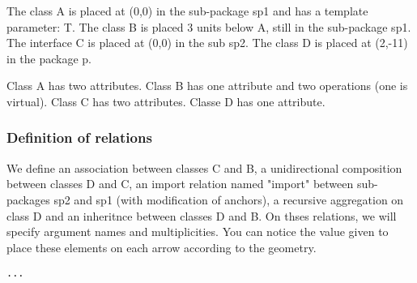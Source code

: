 \documentclass[a4paper,11pt]{report}
\begin{document}
The class A is placed at (0,0) in the sub-package sp1 and has a template parameter: T. The class B is placed 3 units below A, still in the sub-package sp1. The interface C is placed at (0,0) in the sub sp2. 
The class D is placed at (2,-11) in the package p.

Class A has two attributes. Class B has one attribute and two operations (one is virtual). Class C has two attributes. Classe D has one attribute.

\vspace{-0.4cm}
{\color{red!70!black}
\vspace{-0.4cm}
}
\vspace{-0.4cm}
{\color{red!70!black}
\vspace{-0.4cm}
}
\vspace{-0.4cm}
{\color{red!70!black}
\vspace{-0.4cm}
}


\begin{center}
\end{center}


\subsubsection{Definition of relations}

We define an association between classes C and B, a unidirectional composition between classes D and C, an import relation named "import" between sub-packages sp2 and sp1 (with modification of anchors), a recursive aggregation on class D and an inheritnce between classes D and B. On thses relations, we will specify argument names and multiplicities. You can notice the value given to place 
these elements on each arrow according to the geometry.

\medskip

\hspace{-0.7cm}\lstinline{...}
{\color{red!70!black}

}
\end{document}

